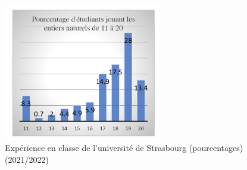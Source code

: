 \begin{Article}
\begin{refsection}[UmbhauerFR]
\begin{table}[h!]
\caption{Quelques expériences du jeu 11-20/bonus20, ainsi que
  l'équilibre de Nash symétrique en stratégies mixtes et la stratégie
  mixte qui minimise le regret}\label{tabl1}
\centering
{}
\end{table}


\begin{figure}[h]
    \centering
    \caption{Expérience en classe de l’université de Strasbourg (pourcentages) (2021/2022)}
    \includegraphics[height=6cm]{Articles-bons-a-composer/02_Umbhauer/02_Umbhauer_fr_Figures/02_Umbhauer_fr_figure-1.jpeg}
\end{figure}


\end{refsection}
\end{Article}
